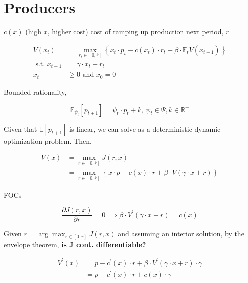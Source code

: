 \documentclass[american]{scrartcl}
\newcommand{\E}{\mathbb{E}}
\newcommand{\R}{\mathbb{R}}
\begin{document}
\section{Producers}

$c(x)$ (high $x$, higher cost) cost of ramping up production next period, $r$

\begin{equation}
	\begin{split}
		V(x_t) &= \max_{r_t \in [0, \bar{r}]} \left\{ x_t \cdot p_t - c(x_t) \cdot r_t + \beta \cdot \E_t V(x_{t+1}) \right\} \\
		\text{ s.t. } x_{t+1} &= \gamma \cdot x_t + r_t \\ x_t &\geq 0 \text{ and } x_0 = 0
	\end{split}
\end{equation}

Bounded rationality,

\begin{equation}
	\E_{\psi_t}[p_{t+1}] = \psi_t \cdot p_t + k, \ \psi_t \in \Psi, k \in \R^+
\end{equation}


Given that $\E\left[p_{t+1}\right]$ is linear, we can solve as a deterministic dynamic optimization problem. Then,

\begin{equation}
	\begin{split}
		V(x) &= \max_{r \in [0, \bar{r}]} J(r, x) \\
		&= \max_{r \in [0, \bar{r}]} \left\{ x \cdot p - c(x) \cdot r + \beta \cdot V(\gamma \cdot x + r) \right\}
	\end{split}
\end{equation}

FOCs

\begin{equation}
	\frac{\partial J(r, x)}{\partial r} = 0 \implies \beta \cdot V^\prime (\gamma \cdot x + r) = c(x)
\end{equation}

Given $r = \arg\max_{r \in [0, \bar{r}]} J(r, x)$ and assuming an interior solution, by the envelope theorem, \textbf{is J cont. differentiable?}

\begin{equation}
	\begin{split}
		V^\prime (x) &= p - c^\prime(x) \cdot r + \beta \cdot V^\prime(\gamma \cdot x + r) \cdot \gamma \\
		&= p - c^\prime(x) \cdot r + c(x) \cdot \gamma
	\end{split}
\end{equation}
\end{document}
